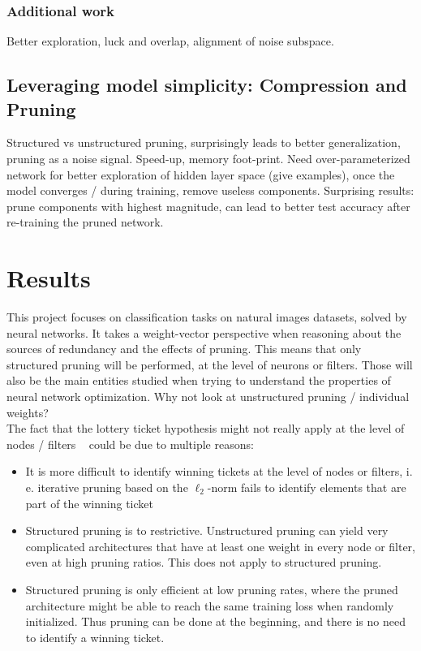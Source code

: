 \subsubsection*{Additional work}
Better exploration, luck and overlap, alignment of noise subspace.


\subsection{Leveraging model simplicity: Compression and Pruning}
Structured vs unstructured pruning, surprisingly leads to better generalization, pruning as a noise signal. Speed-up, memory foot-print. Need over-parameterized network for better exploration of hidden layer space (give examples), once the model converges / during training, remove useless components. Surprising results: prune components with highest magnitude, can lead to better test accuracy after re-training the pruned network.

\section{Results}

This project focuses on classification tasks on natural images datasets, solved by neural networks. It takes a weight-vector perspective when reasoning about the sources of redundancy and the effects of pruning. This means that only structured pruning will be performed, at the level of neurons or filters. Those will also be the main entities studied when trying to understand the properties of neural network optimization. Why not look at unstructured pruning / individual weights? \\

The fact that the lottery ticket hypothesis might not really apply at the level of nodes / filters ~\autocite{liu2018rethinking} could be due to multiple reasons:
\begin{itemize}
\item It is more difficult to identify winning tickets at the level of nodes or filters, i. e. iterative pruning based on the $\ell_2$-norm fails to identify elements that are part of the winning ticket
\item Structured pruning is to restrictive. Unstructured pruning can yield very complicated architectures that have at least one weight in every node or filter, even at high pruning ratios. This does not apply to structured pruning. 
\item Structured pruning is only efficient at low pruning rates, where the pruned architecture might be able to reach the same training loss when randomly initialized. Thus pruning can be done at the beginning, and there is no need to identify a winning ticket.
\end{itemize}

